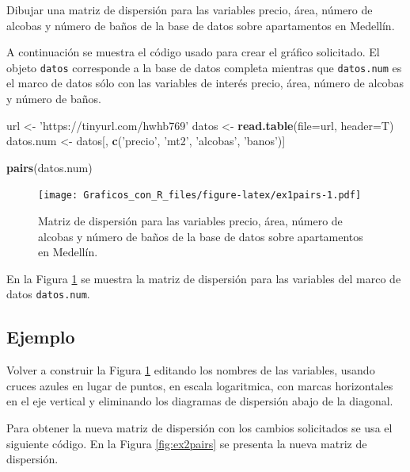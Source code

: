 \documentclass[10pt,]{krantz}
\makeatletter
\newenvironment{Shaded}{\begin{snugshade}}{\end{snugshade}}
\newcommand{\KeywordTok}[1]{\textcolor[rgb]{0.13,0.29,0.53}{\textbf{#1}}}
\newcommand{\DataTypeTok}[1]{\textcolor[rgb]{0.13,0.29,0.53}{#1}}
\newcommand{\StringTok}[1]{\textcolor[rgb]{0.31,0.60,0.02}{#1}}
\newcommand{\NormalTok}[1]{#1}
\newenvironment{kframe}{%
\medskip{}
\setlength{\fboxsep}{.8em}
 \def\at@end@of@kframe{}%
 \ifinner\ifhmode%
  \def\at@end@of@kframe{\end{minipage}}%
  \begin{minipage}{\columnwidth}%
 \fi\fi%
 \def\FrameCommand##1{\hskip\@totalleftmargin \hskip-\fboxsep
 \colorbox{shadecolor}{##1}\hskip-\fboxsep
     \hskip-\linewidth \hskip-\@totalleftmargin \hskip\columnwidth}%
 \MakeFramed {\advance\hsize-\width
   \@totalleftmargin\z@ \linewidth\hsize
   \@setminipage}}%
 {\par\unskip\endMakeFramed%
 \at@end@of@kframe}
\renewenvironment{Shaded}{\begin{kframe}}{\end{kframe}}
\makeatother
\begin{document}
Dibujar una matriz de dispersión para las variables precio, área, número
de alcobas y número de baños de la base de datos sobre apartamentos en
Medellín.

A continuación se muestra el código usado para crear el gráfico
solicitado. El objeto \texttt{datos} corresponde a la base de datos
completa mientras que \texttt{datos.num} es el marco de datos sólo con
las variables de interés precio, área, número de alcobas y número de
baños.

\begin{Shaded}
\begin{Highlighting}[]
\NormalTok{url <-}\StringTok{ 'https://tinyurl.com/hwhb769'}
\NormalTok{datos <-}\StringTok{ }\KeywordTok{read.table}\NormalTok{(}\DataTypeTok{file=}\NormalTok{url, }\DataTypeTok{header=}\NormalTok{T)}
\NormalTok{datos.num <-}\StringTok{ }\NormalTok{datos[, }\KeywordTok{c}\NormalTok{(}\StringTok{'precio'}\NormalTok{, }\StringTok{'mt2'}\NormalTok{, }\StringTok{'alcobas'}\NormalTok{, }\StringTok{'banos'}\NormalTok{)]}

\KeywordTok{pairs}\NormalTok{(datos.num)}
\end{Highlighting}
\end{Shaded}

\begin{figure}
\centering
\texttt{[image: Graficos\_con\_R\_files/figure-latex/ex1pairs-1.pdf]}
\caption{\label{fig:ex1pairs}Matriz de dispersión para las variables precio,
área, número de alcobas y número de baños de la base de datos sobre
apartamentos en Medellín.}
\end{figure}

En la Figura \ref{fig:ex1pairs} se muestra la matriz de dispersión para
las variables del marco de datos \texttt{datos.num}.

\subsection*{Ejemplo}\label{ejemplo-15}


Volver a construir la Figura \ref{fig:ex1pairs} editando los nombres de
las variables, usando cruces azules en lugar de puntos, en escala
logaritmica, con marcas horizontales en el eje vertical y eliminando los
diagramas de dispersión abajo de la diagonal.

Para obtener la nueva matriz de dispersión con los cambios solicitados
se usa el siguiente código. En la Figura \ref{fig:ex2pairs} se presenta
la nueva matriz de dispersión.
\end{document}

